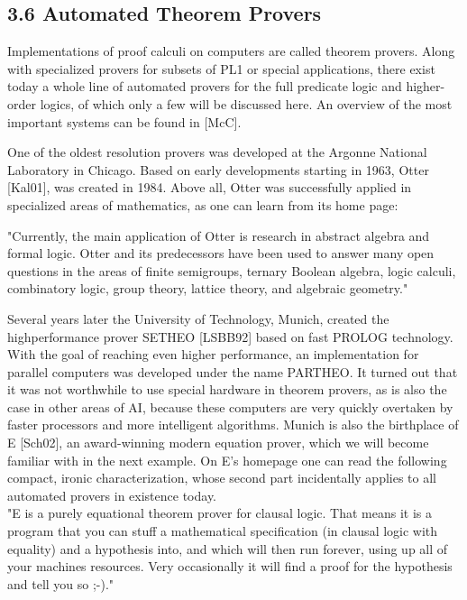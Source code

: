 \documentclass[10pt]{article}
\begin{document}
\subsection*{3.6 Automated Theorem Provers}
Implementations of proof calculi on computers are called theorem provers. Along with specialized provers for subsets of PL1 or special applications, there exist today a whole line of automated provers for the full predicate logic and higher-order logics, of which only a few will be discussed here. An overview of the most important systems can be found in [McC].

One of the oldest resolution provers was developed at the Argonne National Laboratory in Chicago. Based on early developments starting in 1963, Otter [Kal01], was created in 1984. Above all, Otter was successfully applied in specialized areas of mathematics, as one can learn from its home page:

\begin{displayquote}
"Currently, the main application of Otter is research in abstract algebra and formal logic. Otter and its predecessors have been used to answer many open questions in the areas of finite semigroups, ternary Boolean algebra, logic calculi, combinatory logic, group theory, lattice theory, and algebraic geometry."
\end{displayquote}

Several years later the University of Technology, Munich, created the highperformance prover SETHEO [LSBB92] based on fast PROLOG technology. With the goal of reaching even higher performance, an implementation for parallel computers was developed under the name PARTHEO. It turned out that it was not worthwhile to use special hardware in theorem provers, as is also the case in other areas of AI, because these computers are very quickly overtaken by faster processors and more intelligent algorithms. Munich is also the birthplace of E [Sch02], an award-winning modern equation prover, which we will become familiar with in the next example. On E's homepage one can read the following compact, ironic characterization, whose second part incidentally applies to all automated provers in existence today.\\
"E is a purely equational theorem prover for clausal logic. That means it is a program that you can stuff a mathematical specification (in clausal logic with equality) and a hypothesis into, and which will then run forever, using up all of your machines resources. Very occasionally it will find a proof for the hypothesis and tell you so ;-)."
\end{document}
